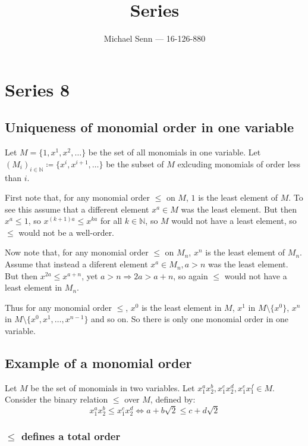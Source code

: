 \documentclass[a4paper]{scrreprt}
\title{Series \series}
\author{Michael Senn \maillink{michael.senn@students.unibe.ch} --- 16-126-880}
\date{\printdate}
\newcommand{\series}{8}
\begin{document}
\maketitle


\setcounter{chapter}{\numexpr \series - 1 \relax}

\chapter{Series \series}

\section{Uniqueness of monomial order in one variable}

Let $M = \{1, x^1, x^2, \ldots\}$ be the set of all monomials in one variable.
Let $(M_i)_{i \in \mathbb{N}} \coloneqq \{x^i, x^{i+1}, \ldots \}$ be the
subset of $M$ exlcuding monomials of order less than $i$.

First note that, for any monomial order $\leq$ on $M$, $1$ is the least element
of $M$. To see this assume that a different element $x^a \in M$ was the least
element. But then $x^a \leq 1$, so $x^{(k+1)a} \leq x^{ka}$ for all $k \in
\mathbb{N}$, so $M$ would not have a least element, so $\leq$ would not be a
well-order.

Now note that, for any monomial order $\leq$ on $M_n$, $x^n$ is the least
element of $M_n$. Assume that instead a diferent element $x^a \in M_n, a > n$
was the least element. But then $x^{2a} \leq x^{a + n}$, yet $a > n \Rightarrow
2a > a+n$, so again $\leq$ would not have a least element in $M_n$.

Thus for any monomial order $\leq$, $x^0$ is the least element in $M$, $x^1$
in $M \setminus\{x^0\}$, $x^n$ in $M \setminus \{x^0, x^1, \ldots, x^{n-1}\}$ and
so on. So there is only one monomial order in one variable.

\section{Example of a monomial order}
\label{sec:monomial_order}

Let $M$ be the set of monomials in two variables. Let $x_1^a x_2^b, x_1^c
x_2^d, x_1^e x_1^f \in M$. Consider the binary relation $\leq$ over $M$,
defined by:
\[
		x_1^a x_2^b \leq x_1^c x_2^d \Leftrightarrow a + b \sqrt{2} \leq c + d \sqrt{2}
\]

\subsection{$\leq$ defines a total order}
\end{document}
